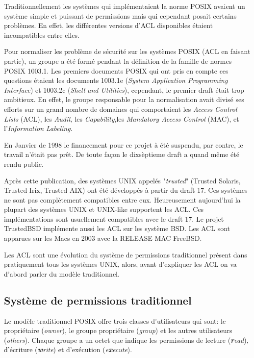 Traditionnellement les systèmes qui implémentaient la norme POSIX avaient un système simple et puissant de permissions mais qui cependant posait certains problèmes. En effet, les différentes versions d'ACL disponibles étaient incompatibles entre elles.
 
Pour normaliser les problème de sécurité sur les systèmes POSIX (ACL en faisant partie), un groupe a été formé pendant la définition de la famille de normes POSIX 1003.1. Les premiers documents POSIX qui ont pris en compte ces questions étaient les documents 1003.1e (\emph{System Application Programming Interface}) et 1003.2c (\emph{Shell and Utilities}), cependant, le premier draft était trop ambitieux. En effet, le groupe responsable pour la normalisation avait divisé ses efforts sur un grand nombre de domaines qui comportaient les \emph{Access Control Lists} (ACL), les \emph{Audit}, les \emph{Capability},les \emph{ Mandatory Access Control }(MAC), et l'\emph{Information Labeling}\cite{aclsuse}.
 
En Janvier de 1998\cite{aclsuse} le financement pour ce projet à été suspendu, par contre, le travail n'était pas prêt. De toute façon le dixsèptieme draft a quand même été rendu public\cite{posix17}.
 
Après cette publication, des systèmes UNIX appelés "\emph{trusted}" (Trusted Solaris, Trusted Irix, Trusted AIX) ont été développés à partir du draft 17. Ces systèmes ne sont pas complètement compatibles entre eux. Heureusement aujourd'hui la plupart des systèmes UNIX et UNIX-like supportent les ACL. Ces implémentations sont usuellement compatibles avec le draft 17. Le projet TrustedBSD implémente aussi les ACL sur les système BSD. Les ACL sont apparues sur les Macs en 2003 avec la RELEASE MAC FreeBSD.
 
Les ACL sont une évolution du système de permissions traditionnel présent dans pratiquement tous les systèmes UNIX, alors, avant d'expliquer les ACL on va d'abord parler du modèle traditionnel.
 
\subsection*{Système de permissions traditionnel}
 
Le modèle traditionnel POSIX offre trois classes d'utilisateurs qui sont: le propriétaire (\emph{owner}), le groupe propriétaire (\emph{group}) et les autres utilisateurs (\emph{others}). Chaque groupe a un octet que indique les permissions de lecture (\emph{\textbf{r}ead}), d'écriture (\emph{\textbf{w}rite}) et d'exécution (\emph{e\textbf{x}ecute}).
 
